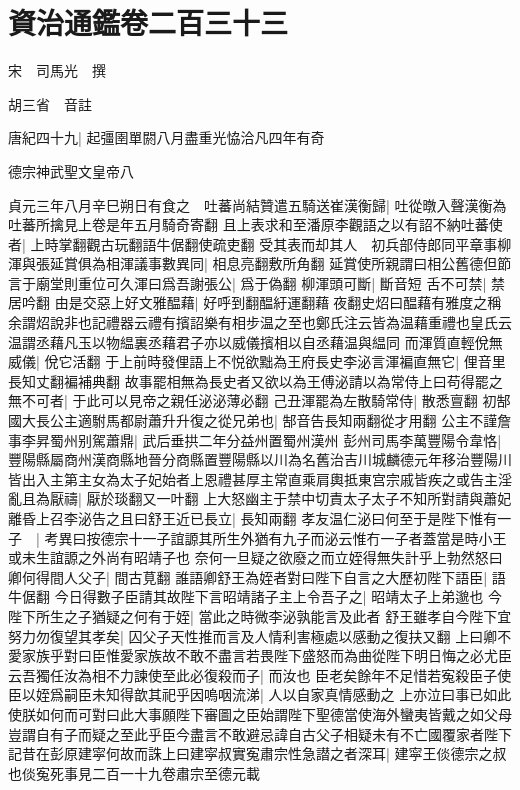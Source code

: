\section{資治通鑑卷二百三十三}
宋　司馬光　撰

胡三省　音註

唐紀四十九|{
	起彊圉單閼八月盡重光恊洽凡四年有奇}


德宗神武聖文皇帝八

貞元三年八月辛巳朔日有食之　吐蕃尚結贊遣五騎送崔漢衡歸|{
	吐從暾入聲漢衡為吐蕃所擒見上卷是年五月騎奇寄翻}
且上表求和至潘原李觀語之以有詔不納吐蕃使者|{
	上時掌翻觀古玩翻語牛倨翻使疏吏翻}
受其表而却其人　初兵部侍郎同平章事柳渾與張延賞俱為相渾議事數異同|{
	相息亮翻敷所角翻}
延賞使所親謂曰相公舊德但節言于廟堂則重位可久渾曰爲吾謝張公|{
	爲于偽翻}
柳渾頭可斷|{
	斷音短}
舌不可禁|{
	禁居吟翻}
由是交惡上好文雅醖藉|{
	好呼到翻醖紆運翻藉夜翻史炤曰醖藉有雅度之稱余謂炤說非也記禮器云禮有擯詔樂有相步温之至也鄭氏注云皆為温藉重禮也皇氏云温謂丞藉凡玉以物緼裏丞藉君子亦以威儀擯相以自丞藉温與緼同}
而渾質直輕侻無威儀|{
	侻它活翻}
于上前時發俚語上不悦欲黜為王府長史李泌言渾褊直無它|{
	俚音里長知丈翻褊補典翻}
故事罷相無為長史者又欲以為王傅泌請以為常侍上曰苟得罷之無不可者|{
	于此可以見帝之親任泌泌薄必翻}
己丑渾罷為左散騎常侍|{
	散悉亶翻}
初郜國大長公主適駙馬都尉蕭升升復之從兄弟也|{
	郜音告長知兩翻從才用翻}
公主不謹詹事李昇蜀州别駕蕭鼎|{
	武后垂拱二年分益州置蜀州漢州}
彭州司馬李萬豐陽令韋恪|{
	豐陽縣屬商州漢商縣地晉分商縣置豐陽縣以川為名舊治吉川城麟德元年移治豐陽川}
皆出入主第主女為太子妃始者上恩禮甚厚主常直乘肩輿抵東宫宗戚皆疾之或告主淫亂且為厭禱|{
	厭於琰翻又一叶翻}
上大怒幽主于禁中切責太子太子不知所對請與蕭妃離昏上召李泌告之且曰舒王近已長立|{
	長知兩翻}
孝友温仁泌曰何至于是陛下惟有一子　|{
	考異曰按德宗十一子誼謜其所生外猶有九子而泌云惟冇一子者蓋當是時小王或未生誼謜之外尚有昭靖子也}
奈何一旦疑之欲廢之而立姪得無失計乎上勃然怒曰卿何得間人父子|{
	間古莧翻}
誰語卿舒王為姪者對曰陛下自言之大歷初陛下語臣|{
	語牛倨翻}
今日得數子臣請其故陛下言昭靖諸子主上令吾子之|{
	昭靖太子上弟邈也}
今陛下所生之子猶疑之何有于姪|{
	當此之時微李泌孰能言及此者}
舒王雖孝自今陛下宜努力勿復望其孝矣|{
	囚父子天性推而言及人情利害極處以感動之復扶又翻}
上曰卿不愛家族乎對曰臣惟愛家族故不敢不盡言若畏陛下盛怒而為曲從陛下明日悔之必尤臣云吾獨任汝為相不力諫使至此必復殺而子|{
	而汝也}
臣老矣餘年不足惜若寃殺臣子使臣以姪爲嗣臣未知得歆其祀乎因嗚咽流涕|{
	人以自家真情感動之}
上亦泣曰事已如此使朕如何而可對曰此大事願陛下審圖之臣始謂陛下聖德當使海外蠻夷皆戴之如父母豈謂自有子而疑之至此乎臣今盡言不敢避忌諱自古父子相疑未有不亡國覆家者陛下記昔在彭原建寜何故而誅上曰建寜叔實寃肅宗性急譛之者深耳|{
	建寜王倓德宗之叔也倓寃死事見二百一十九卷肅宗至德元載}
